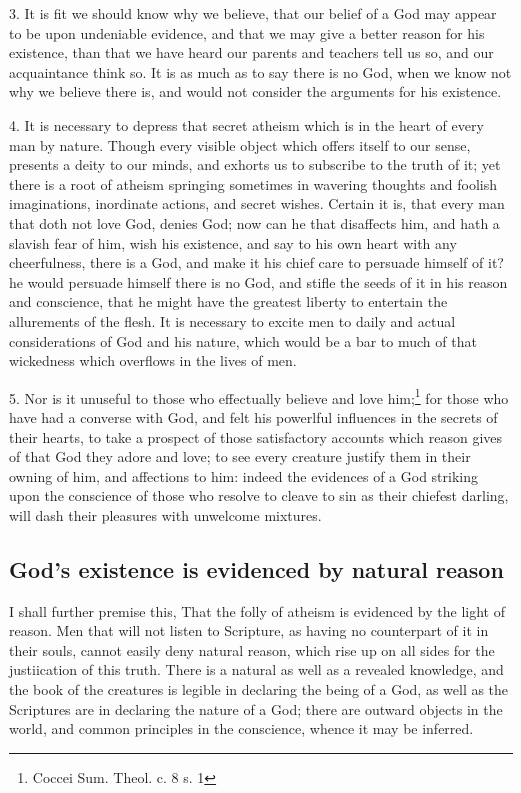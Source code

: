 \documentclass[a5paper]{book}
\begin{document}
3. It is fit we should know why we believe, 
    that our belief of a God may appear to be upon undeniable evidence, 
    and that we may give a better reason for his existence, 
    than that we have heard our %
    parents and teachers tell us so, and our acquaintance think so. 
It is as much as to say there is no God, 
    when we know not why we believe there is, 
    and would not consider the arguments for his existence.

4. It is necessary to depress that secret atheism which is in the
    heart of every man by nature. 
Though every visible object which offers itself to our sense, 
    presents a deity to our minds, 
    and exhorts us to subscribe to the truth of it; 
    yet there is a root of atheism springing sometimes 
    in wavering thoughts and foolish imaginations, 
    inordinate actions, and secret wishes. 
Certain it is, that every man that doth not love God, denies God; 
    now can he that disaffects him, and hath a slavish fear of him, 
    wish his existence, and say to his own heart with any cheerfulness, 
    there is a God, and make it his chief care to persuade himself of it? 
    he would persuade himself there is no God, 
    and stifle the seeds of it in his reason and conscience, 
    that he might have the greatest liberty to entertain 
    the allurements of the flesh. 
It is necessary to excite men to daily and actual considerations 
    of God and his nature, 
    which would be a bar to much of that wickedness which overflows 
    in the lives of men.

5. Nor is it unuseful to those who effectually believe and love him;\footnote{
        Coccei Sum. Theol. c. 8 s. 1}
    for those who have had a converse with God, 
    and felt his powerlful influences in the secrets of their hearts, 
    to take a prospect of those satisfactory accounts 
    which reason gives of that God they adore and love; 
    to see every creature justify them in their owning of him, 
    and affections to him: 
    indeed the evidences of a God striking upon the conscience 
    of those who resolve to cleave to sin as their chiefest darling, 
    will dash their pleasures with unwelcome mixtures.

\subsection{God's existence is evidenced by natural reason}
I shall further premise this, 
    That the folly of atheism is evidenced by the light of reason. 
Men that will not listen to Scripture, 
    as having no counterpart of it in their souls, 
    cannot easily deny natural reason, 
    which rise up on all sides for the justiication of this truth.
There is a natural as well as a revealed knowledge, 
    and the book of the creatures is legible in declaring the being of a God, 
    as well as the Scriptures are in declaring the nature of a God; 
    there are outward objects in the world, 
    and common principles in the conscience, whence it may be inferred.
\end{document}
